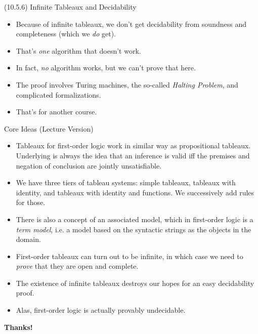 \begin{frame}{(10.5.6) Infinite Tableaux and Decidability}

	\begin{itemize}

		\item Because of infinite tableaux, we don't get decidability from soundness and completeness (which we \emph{do} get).
		
		\item That's \emph{one} algorithm that doesn't work.
		
		\item In fact, \emph{no} algorithm works, but we can't prove that here.
		
		\item The proof involves Turing machines, the so-called \emph{Halting Problem}, and complicated formalizations.
		
		\item That's for another course.

	\end{itemize}

\end{frame}

\begin{frame}{Core Ideas (Lecture Version)}

\begin{itemize}
	
		\item Tableaux for first-order logic work in similar way as propositional tableaux. Underlying is always the idea that an inference is valid iff the premises and negation of conclusion are jointly unsatisfiable.				
		\item We have three tiers of tableau systems: simple tableaux, tableaux with identity, and tableaux with identity and functions. We successively add rules for those.
		
		\item There is also a concept of an associated model, which in first-order logic is a \emph{term model}, i.e. a model based on the syntactic strings as the objects in the domain.
		
		\item First-order tableaux can turn out to be infinite, in which case we need to \emph{prove} that they are open and complete.
		
		\item The existence of infinite tableaux destroys our hopes for an easy decidability proof.
		
		\item Alas, first-order logic is actually provably undecidable.
	
	\end{itemize}

\end{frame}

\begin{frame}

	\begin{center}
	{\huge\bf Thanks!}
	\end{center}

\end{frame}
